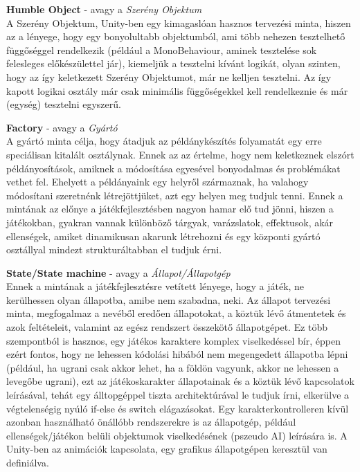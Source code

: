 \textbf{Humble Object} - avagy a \textit{Szerény Objektum}\\
A Szerény Objektum, Unity-ben egy kimagaslóan hasznos tervezési minta, hiszen az a lényege, hogy egy bonyolultabb objektumból, ami több nehezen tesztelhető függőséggel rendelkezik (például a MonoBehaviour, aminek tesztelése sok felesleges előkészülettel jár), kiemeljük a tesztelni kívánt logikát, olyan szinten, hogy az így keletkezett Szerény Objektumot, már ne kelljen tesztelni. Az így kapott logikai osztály már csak minimális függőségekkel kell rendelkeznie és már (egység) tesztelni egyszerű.

\textbf{Factory} - avagy a \textit{Gyártó}\\
A gyártó minta célja, hogy átadjuk az példánykészítés folyamatát egy erre speciálisan kitalált osztálynak. Ennek az az értelme, hogy nem keletkeznek elszórt példányosítások, amiknek a módosítása egyesével bonyodalmas és problémákat vethet fel. Ehelyett a példányaink egy helyről származnak, ha valahogy módosítani szeretnénk létrejöttjüket, azt egy helyen meg tudjuk tenni. Ennek a mintának az előnye a játékfejlesztésben nagyon hamar elő tud jönni, hiszen a játékokban, gyakran vannak különböző tárgyak, varázslatok, effektusok, akár ellenségek, amiket dinamikusan akarunk létrehozni és egy központi gyártó osztállyal mindezt strukturáltabban el tudjuk érni.

\textbf{State/State machine} - avagy a \textit{Állapot/Állapotgép}\\
Ennek a mintának a játékfejlesztésre vetített lényege, hogy a játék, ne kerülhessen olyan állapotba, amibe nem szabadna, neki. Az állapot tervezési minta, megfogalmaz a nevéből eredően állapotokat, a köztük lévő átmentetek és azok feltételeit, valamint az egész rendszert összekötő állapotgépet. Ez több szempontból is hasznos, egy játékos karaktere komplex viselkedéssel bír, éppen ezért fontos, hogy ne lehessen kódolási hibából nem megengedett állapotba lépni (például, ha ugrani csak akkor lehet, ha a földön vagyunk, akkor ne lehessen a levegőbe ugrani), ezt az játékoskarakter állapotainak és a köztük lévő kapcsolatok leírásával, tehát egy álltopgéppel tiszta architektúrával le tudjuk írni, elkerülve a végtelenségig nyúló if-else és switch elágazásokat. Egy karakterkontrolleren kívül azonban használható önállóbb rendszerekre is az állapotgép, például ellenségek/játékon belüli objektumok viselkedésének (pszeudo AI) leírására is. A Unity-ben az animációk kapcsolata, egy grafikus állapotgépen keresztül van definiálva.

